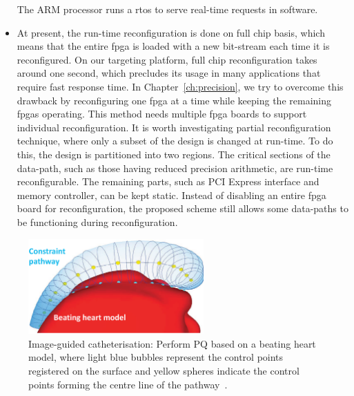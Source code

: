 \begin{itemize}
The ARM processor runs a \gls{rtos} to serve real-time requests in software.
\item At present, the run-time reconfiguration is done on full chip basis, which means that the entire \gls{fpga} is loaded with a new bit-stream each time it is reconfigured.
On our targeting platform, full chip reconfiguration takes around one second, which precludes its usage in many applications that require fast response time.
In Chapter~\ref{ch:precision}, we try to overcome this drawback by reconfiguring one \gls{fpga} at a time while keeping the remaining \glspl{fpga} operating.
This method needs multiple \gls{fpga} boards to support individual reconfiguration.
It is worth investigating partial reconfiguration technique, where only a subset of the design is changed at run-time.
To do this, the design is partitioned into two regions.
The critical sections of the data-path, such as those having reduced precision arithmetic, are run-time reconfigurable.
The remaining parts, such as PCI Express interface and memory controller, can be kept static.
Instead of disabling an entire \gls{fpga} board for reconfiguration, the proposed scheme still allows some data-paths to be functioning during reconfiguration.
\end{itemize}

\begin{figure}[t!]
\centering
\includegraphics[width=0.6\textwidth]{6_conclusion/figures/heart_model}
\caption{Image-guided catheterisation: Perform PQ based on a beating heart model, where light blue bubbles represent the control points registered on the surface and yellow spheres indicate the control points forming the centre line of the pathway~\cite{kwok13}.}
\label{fig:heart_model}
\end{figure}

